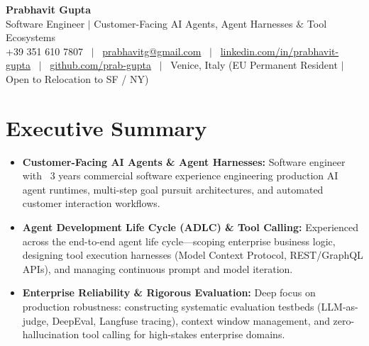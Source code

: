 \documentclass[a4paper,10pt]{article}
\begin{document}
\begin{minipage}[c]{0.80\textwidth}
  {\Huge\bfseries Prabhavit Gupta}\\[3pt]
  {\color{accent}\large Software Engineer $\vert$ Customer-Facing AI Agents, Agent Harnesses $\&$ Tool Ecosystems}\\[6pt]
  {\footnotesize +39 351 610 7807 ~$\vert$~
  \href{mailto:prabhavitg@gmail.com}{prabhavitg@gmail.com} ~$\vert$~
  \href{https://www.linkedin.com/in/prabhavit-gupta}{linkedin.com/in/prabhavit-gupta} ~$\vert$~
  \href{https://github.com/prab-gupta}{github.com/prab-gupta} ~$\vert$~
  Venice, Italy (EU Permanent Resident $\vert$ Open to Relocation to SF / NY)}
\end{minipage}\hfill

\vspace{6pt}

\section{Executive Summary}
\begin{itemize}
  \item \textbf{Customer-Facing AI Agents \& Agent Harnesses:} Software engineer with ~3 years commercial software experience engineering production AI agent runtimes, multi-step goal pursuit architectures, and automated customer interaction workflows.
  \item \textbf{Agent Development Life Cycle (ADLC) \& Tool Calling:} Experienced across the end-to-end agent life cycle---scoping enterprise business logic, designing tool execution harnesses (Model Context Protocol, REST/GraphQL APIs), and managing continuous prompt and model iteration.
  \item \textbf{Enterprise Reliability \& Rigorous Evaluation:} Deep focus on production robustness: constructing systematic evaluation testbeds (LLM-as-judge, DeepEval, Langfuse tracing), context window management, and zero-hallucination tool calling for high-stakes enterprise domains.
\end{itemize}

\end{document}

